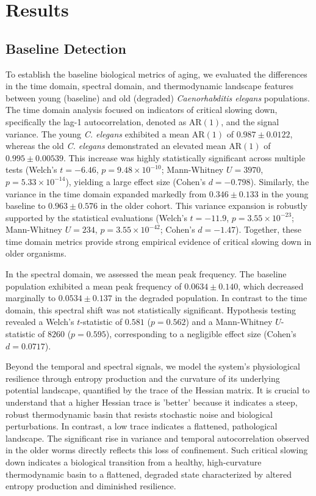 \documentclass{article}
\begin{document}
\section{Results}
\subsection{Baseline Detection}
To establish the baseline biological metrics of aging, we evaluated the differences in the time domain, spectral domain, and thermodynamic landscape features between young (baseline) and old (degraded) \textit{Caenorhabditis elegans} populations. The time domain analysis focused on indicators of critical slowing down, specifically the lag-1 autocorrelation, denoted as $\text{AR}(1)$, and the signal variance. The young \textit{C. elegans} exhibited a mean $\text{AR}(1)$ of $0.987 \pm 0.0122$, whereas the old \textit{C. elegans} demonstrated an elevated mean $\text{AR}(1)$ of $0.995 \pm 0.00539$. This increase was highly statistically significant across multiple tests (Welch's $t = -6.46$, $p = 9.48 \times 10^{-10}$; Mann-Whitney $U = 3970$, $p = 5.33 \times 10^{-14}$), yielding a large effect size (Cohen's $d = -0.798$). Similarly, the variance in the time domain expanded markedly from $0.346 \pm 0.133$ in the young baseline to $0.963 \pm 0.576$ in the older cohort. This variance expansion is robustly supported by the statistical evaluations (Welch's $t = -11.9$, $p = 3.55 \times 10^{-23}$; Mann-Whitney $U = 234$, $p = 3.55 \times 10^{-42}$; Cohen's $d = -1.47$). Together, these time domain metrics provide strong empirical evidence of critical slowing down in older organisms.

In the spectral domain, we assessed the mean peak frequency. The baseline population exhibited a mean peak frequency of $0.0634 \pm 0.140$, which decreased marginally to $0.0534 \pm 0.137$ in the degraded population. In contrast to the time domain, this spectral shift was not statistically significant. Hypothesis testing revealed a Welch's $t$-statistic of $0.581$ ($p = 0.562$) and a Mann-Whitney $U$-statistic of $8260$ ($p = 0.595$), corresponding to a negligible effect size (Cohen's $d = 0.0717$). 

Beyond the temporal and spectral signals, we model the system's physiological resilience through entropy production and the curvature of its underlying potential landscape, quantified by the trace of the Hessian matrix. It is crucial to understand that a higher Hessian trace is 'better' because it indicates a steep, robust thermodynamic basin that resists stochastic noise and biological perturbations. In contrast, a low trace indicates a flattened, pathological landscape. The significant rise in variance and temporal autocorrelation observed in the older worms directly reflects this loss of confinement. Such critical slowing down indicates a biological transition from a healthy, high-curvature thermodynamic basin to a flattened, degraded state characterized by altered entropy production and diminished resilience.
\end{document}

